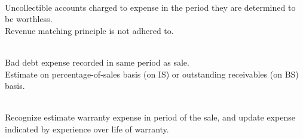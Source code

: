\begin{method} \\
Uncollectible accounts charged to expense in the period they are determined to be worthless.\\
Revenue matching principle is not adhered to.
\end{method}

\begin{method} \\
Bad debt expense recorded in same period as sale.\\
Estimate on percentage-of-sales basis (on IS) or outstanding receivables (on BS) basis.
\end{method}

\begin{method} \\
Recognize estimate warranty expense in period of the sale, and update expense indicated by experience over life of warranty.
\end{method}
